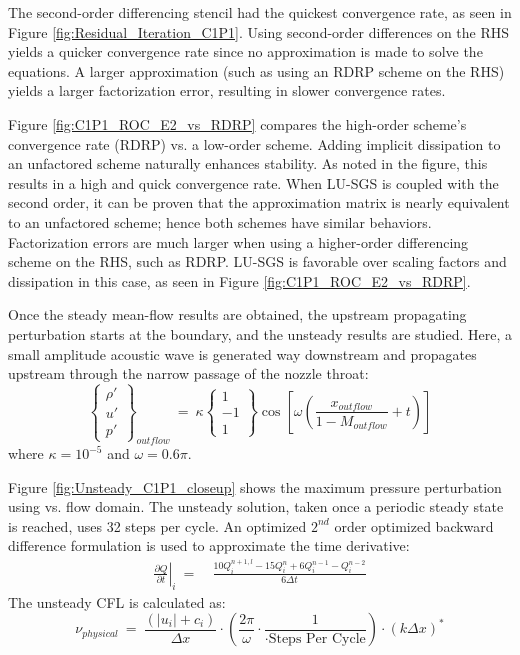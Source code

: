 \documentclass[conf]{new-aiaa}
\begin{document}
The second-order differencing stencil had the quickest convergence rate, as seen in Figure \ref{fig:Residual_Iteration_C1P1}. 
Using second-order differences on the RHS yields a quicker convergence rate since no approximation is made to solve the equations. 
A larger approximation (such as using an RDRP scheme on the RHS) yields a larger factorization error, resulting in slower convergence rates. 

Figure \ref{fig:C1P1_ROC_E2_vs_RDRP} compares the high-order scheme's convergence rate (RDRP) vs. a low-order scheme. 
Adding implicit dissipation to an unfactored scheme naturally enhances stability. 
As noted in the figure, this results in a high and quick convergence rate. 
When LU-SGS is coupled with the second order, it can be proven that the approximation matrix is nearly equivalent to an unfactored scheme; hence both schemes have similar behaviors. 
Factorization errors are much larger when using a higher-order differencing scheme on the RHS, such as RDRP.  
LU-SGS is favorable over scaling factors and dissipation in this case, as seen in Figure \ref{fig:C1P1_ROC_E2_vs_RDRP}.


Once the steady mean-flow results are obtained, the upstream propagating perturbation starts at the boundary, and the unsteady results are studied.  
Here, a small amplitude acoustic wave is generated way downstream and propagates upstream through the narrow passage of the nozzle throat:
\begin{equation*}
	\left\{
	\begin{matrix}
		{\rho}' \\
		{u}' \\
		{p}'
	\end{matrix}
	\right\}_{outflow}~=~
\kappa
	\left\{
	\begin{matrix}
		1 \\
		-1 \\
		1
	\end{matrix}
	\right\}\cos\left[\omega\left(\frac{x_{outflow}}{1-M_{outflow}}+t\right)\right]
\end{equation*}
where $\kappa=10^{-5}$ and $\omega=0.6\pi$. 

Figure \ref{fig:Unsteady_C1P1_closeup} shows the maximum pressure perturbation using vs. flow domain. 
The unsteady solution, taken once a periodic steady state is reached, uses 32 steps per cycle. An optimized $2^{nd}$ order optimized backward difference formulation \cite{HixonImplicit} is used to approximate the time derivative:
\begin{equation}
	\begin{split}
		\label{eq:2ndOrderdQdT}
  			\left.\frac{\partial{Q}}{\partial{t}}\right|_i~=&~\frac{10Q_i^{n+1, l}-15Q_i^n+6Q_i^{n-1}-Q_i^{n-2}}{6\Delta{t}}
	\end{split}
\end{equation}
The unsteady CFL is calculated as:
\begin{equation*}
	\nu_{physical}
  			~=~\frac{\left(\left|u_i\right|+c_i\right)}{\Delta{x}}\cdot\left(\frac{2\pi}{\omega}\cdot\frac{1}{\cdot \text{Steps~Per~Cycle}}\right)\cdot\left(k\Delta{x}\right)^*
\end{equation*}
\end{document}
